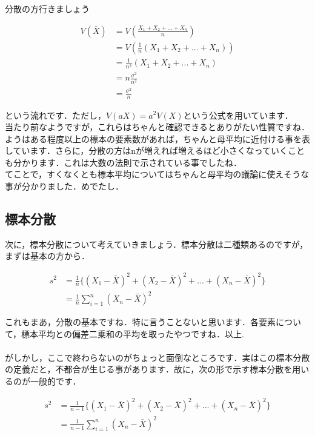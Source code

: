 \documentclass[11pt,a4paper]{ujreport} 	%
\begin{document}
分散の方行きましょう

\begin{align}
  V(\bar{X}) &= V(\frac{X_1+X_2+...+X_n}{n})\\
             &= V(\frac{1}{n}(X_1 + X_2 +...+ X_n)) \\
             &= \frac{1}{n^2}(X_1 + X_2+...+X_n)\\
             &= n\frac{\sigma^2}{n^2}\\
             &= \frac{\sigma^2}{n}
             \label{eq:hyohonvar1}
\end{align}

という流れです．ただし，$V(aX) = a^2 V(X)$という公式を用いています．\\



当たり前なようですが，これらはちゃんと確認できるとありがたい性質ですね．ようはある程度以上の標本の要素数があれば，ちゃんと母平均に近付ける事を表しています．さらに，分散の方はnが増えれば増えるほど小さくなっていくことも分かります．これは大数の法則で示されている事でしたね．\\

てことで，すくなくとも標本平均についてはちゃんと母平均の議論に使えそうな事が分かりました．めでたし．



\subsection{標本分散}
次に，標本分散について考えていきましょう．標本分散は二種類あるのですが，まずは基本の方から．

\begin{align}
  s^2 &= \frac{1}{n}\{ (X_1-\bar{X})^2 + (X_2-\bar{X})^2 + ...+(X_n - \bar{X})^2 \}\\
      &= \frac{1}{n} \sum_{i=1}^n(X_n - \bar{X})^2
      \label{eq:hyohonvar}
\end{align}

これもまあ，分散の基本ですね．特に言うことないと思います．各要素について，標本平均との偏差二乗和の平均を取ったやつですね．以上.\\
\\

がしかし，ここで終わらないのがちょっと面倒なところです．実はこの標本分散の定義だと，不都合が生じる事があります．故に，次の形で示す標本分散を用いるのが一般的です．

\begin{align}
  s^2 &= \frac{1}{n-1}\{ (X_1-\bar{X})^2 + (X_2-\bar{X})^2 + ...+(X_n - \bar{X})^2 \}\\
      &= \frac{1}{n-1} \sum_{i=1}^n(X_n - \bar{X})^2
\end{align}
\end{document}
